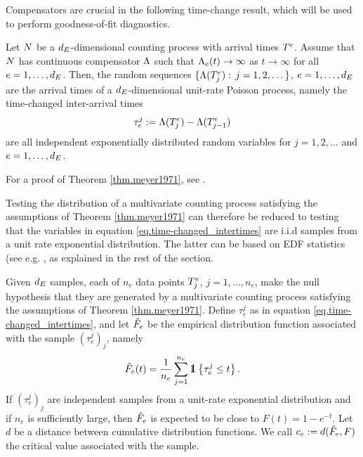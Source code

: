 \documentclass[10pt, article,table]{article}
\begin{document}
Compensators are crucial in the following time-change result, which will be used to perform goodness-of-fit diagnostics.

\begin{thm}\label{thm.meyer1971}
Let $N$ be a $d_{E}$-dimensional counting process with arrival times $T^{e}$. Assume that $N$ has continuous compensator $\Lambda$ such that $\Lambda_{e}(t) \rightarrow \infty$ as $t\rightarrow \infty$ for all $e=1, \dots, d_{E}$. Then, the random sequences $\lbrace \Lambda(T^{e}_{j}): \, j=1,2,\dots \rbrace$, $e=1,\dots, d_{E}$ are the arrival times of a $d_{E}$-dimensional unit-rate Poisson process, namely the time-changed inter-arrival times
\begin{equation}\label{eq.time-changed_intertimes}
 \tau_e^j := \Lambda(T^{e}_{j}) - \Lambda(T^{e}_{j-1})
\end{equation}
are all independent exponentially distributed random variables for $j=1,2,\dots$ and $e=1,\dots,d_{E}$.  
\end{thm}
For a proof of Theorem \ref{thm.meyer1971}, see \citealp{BN88sim}. 

Testing the distribution of a multivariate counting process satisfying the assumptions of Theorem \ref{thm.meyer1971} can therefore be reduced to testing that the variables in equation \eqref{eq.time-changed_intertimes} are i.i.d samples from a unit rate exponential distribution. The latter can be based on EDF statistics (see e.g. \citealp[Chapter 4]{DS86goo}, as explained in the rest of the section. 

Given $d_{E}$ samples, each of $n_e$ data points $T^{e}_{j}$, $j=1,\dots,n_e$, make the null hypothesis that they are generated by a multivariate counting process satisfying the assumptions of Theorem \ref{thm.meyer1971}. Define $\tau_e^j$ as in equation \eqref{eq.time-changed_intertimes}, and let $\hat{F}_{e}$ be the empirical distribution function associated with the sample $(\tau_e^j)_j$, namely 
\begin{equation*}
 \EDFfun(t) = \frac{1}{n_e}\sum_{j=1}^{n_e} \one \left\lbrace \tau_e^j \leq t \right\rbrace.
\end{equation*}
If $(\tau_e^j)_j$ are independent samples from a unit-rate exponential distribution and if $n_e$ is sufficiently large, then $\hat{F}_{e}$ is expected to be close to $F(t)=1-e^{-t}$. 
Let $d$ be a distance between cumulative distribution functions. We call $c_e:=d(\hat{F}_{e}, F)$ the critical value associated with the sample. 
\end{document}
